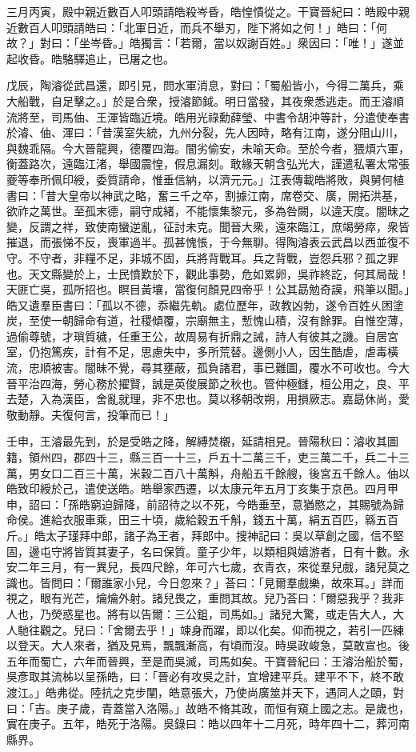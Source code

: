 \begin{pinyinscope}
三月丙寅，殿中親近數百人叩頭請皓殺岑昏，皓惶憒從之。干寶晉紀曰：皓殿中親近數百人叩頭請皓曰：「北軍日近，而兵不舉刃，陛下將如之何！」皓曰：「何故？」對曰：「坐岑昏。」皓獨言：「若爾，當以奴謝百姓。」衆因曰：「唯！」遂並起收昏。皓駱驛追止，已屠之也。

戊辰，陶濬從武昌還，即引見，問水軍消息，對曰：「蜀船皆小，今得二萬兵，乘大船戰，自足擊之。」於是合衆，授濬節鉞。明日當發，其夜衆悉逃走。而王濬順流將至，司馬伷、王渾皆臨近境。皓用光祿勳薛瑩、中書令胡沖等計，分遣使奉書於濬、伷、渾曰：「昔漢室失統，九州分裂，先人因時，略有江南，遂分阻山川，與魏乖隔。今大晉龍興，德覆四海。闇劣偷安，未喻天命。至於今者，猥煩六軍，衡蓋路次，遠臨江渚，舉國震惶，假息漏刻。敢緣天朝含弘光大，謹遣私署太常張夔等奉所佩印綬，委質請命，惟垂信納，以濟元元。」江表傳載皓將敗，與舅何植書曰：「昔大皇帝以神武之略，奮三千之卒，割據江南，席卷交、廣，開拓洪基，欲祚之萬世。至孤末德，嗣守成緒，不能懷集黎元，多為咎闕，以違天度。闇昧之變，反謂之祥，致使南蠻逆亂，征討未克。聞晉大衆，遠來臨江，庶竭勞瘁，衆皆摧退，而張悌不反，喪軍過半。孤甚愧悵，于今無聊。得陶濬表云武昌以西並復不守。不守者，非糧不足，非城不固，兵將背戰耳。兵之背戰，豈怨兵邪？孤之罪也。天文縣變於上，士民憤歎於下，觀此事勢，危如累卵，吳祚終訖，何其局哉！天匪亡吳，孤所招也。瞑目黃壤，當復何顏見四帝乎！公其勗勉奇謨，飛筆以聞。」皓又遺羣臣書曰：「孤以不德，忝繼先軌。處位歷年，政教凶勃，遂令百姓乆困塗炭，至使一朝歸命有道，社稷傾覆，宗廟無主，慙愧山積，沒有餘罪。自惟空薄，過偷尊號，才瑣質穢，任重王公，故周易有折鼎之誡，詩人有彼其之譏。自居宮室，仍抱篤疾，計有不足，思慮失中，多所荒替。邊側小人，因生酷虐，虐毒橫流，忠順被害。闇昧不覺，尋其壅蔽，孤負諸君，事已難圖，覆水不可收也。今大晉平治四海，勞心務於擢賢，誠是英俊展節之秋也。管仲極讎，桓公用之，良、平去楚，入為漢臣，舍亂就理，非不忠也。莫以移朝改朔，用損厥志。嘉勗休尚，愛敬動靜。夫復何言，投筆而已！」

壬申，王濬最先到，於是受皓之降，解縛焚櫬，延請相見。晉陽秋曰：濬收其圖籍，領州四，郡四十三，縣三百一十三，戶五十二萬三千，吏三萬二千，兵二十三萬，男女口二百三十萬，米穀二百八十萬斛，舟船五千餘艘，後宮五千餘人。伷以皓致印綬於己，遣使送皓。皓舉家西遷，以太康元年五月丁亥集于京邑。四月甲申，詔曰：「孫皓窮迫歸降，前詔待之以不死，今皓垂至，意猶愍之，其賜號為歸命侯。進給衣服車乘，田三十頃，歲給穀五千斛，錢五十萬，絹五百匹，緜五百斤。」皓太子瑾拜中郎，諸子為王者，拜郎中。搜神記曰：吳以草創之國，信不堅固，邊屯守將皆質其妻子，名曰保質。童子少年，以類相與嬉游者，日有十數。永安二年三月，有一異兒，長四尺餘，年可六七歲，衣青衣，來從羣兒戲，諸兒莫之識也。皆問曰：「爾誰家小兒，今日忽來？」荅曰：「見爾羣戲樂，故來耳。」詳而視之，眼有光芒，爚爚外射。諸兒畏之，重問其故。兒乃荅曰：「爾惡我乎？我非人也，乃熒惑星也。將有以告爾：三公鉏，司馬如。」諸兒大驚，或走告大人，大人馳往觀之。兒曰：「舍爾去乎！」竦身而躍，即以化矣。仰而視之，若引一匹練以登天。大人來者，猶及見焉，飄飄漸高，有頃而沒。時吳政峻急，莫敢宣也。後五年而蜀亡，六年而晉興，至是而吳滅，司馬如矣。干寶晉紀曰：王濬治船於蜀，吳彥取其流柹以呈孫皓，曰：「晉必有攻吳之計，宜增建平兵。建平不下，終不敢渡江。」皓弗從。陸抗之克步闡，皓意張大，乃使尚廣筮并天下，遇同人之頤，對曰：「吉。庚子歲，青蓋當入洛陽。」故皓不脩其政，而恒有窺上國之志。是歲也，實在庚子。五年，皓死于洛陽。吳錄曰：皓以四年十二月死，時年四十二，葬河南縣界。


\end{pinyinscope}
